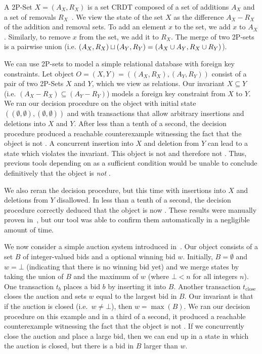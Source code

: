 A 2P-Set $X = (A_X, R_X)$ is a set CRDT composed of a set of additions $A_X$
and a set of removals $R_X$~\cite{shapiro2011comprehensive}. We view the state
of the set $X$ as the difference $A_X - R_X$ of the addition and removal sets.
To add an element $x$ to the set, we add $x$ to $A_X$. Similarly, to remove $x$
from the set, we add it to $R_X$. The merge of two 2P-sets is a pairwise union
(i.e. $(A_X, R_X) \sqcup (A_Y, R_Y) = (A_X \cup A_Y, R_X \cup R_Y)$).

We can use 2P-sets to model a simple relational database with foreign key
constraints. Let object $O = (X, Y) = ((A_X, R_X), (A_Y, R_Y))$ consist of a
pair of two 2P-Sets $X$ and $Y$, which we view as relations. Our invariant $X
\subseteq Y$ (i.e. $(A_X - R_X) \subseteq (A_Y - R_Y)$) models a foreign key
constraint from $X$ to $Y$. We ran our decision procedure on the object with
initial state $((\emptyset, \emptyset), (\emptyset, \emptyset))$ and with
transactions that allow arbitrary insertions and deletions into $X$ and $Y$.
After less than a tenth of a second, the decision procedure produced a
reachable counterexample witnessing the fact that the object is not
\invariantconfluent{}. A concurrent insertion into $X$ and deletion from $Y$
can lead to a state which violates the invariant. This object is not
\invariantconfluent{} and therefore not \invariantclosed{}. Thus, previous
tools depending on \invariantclosure{} as a sufficient condition would be
unable to conclude definitively that the object is \emph{not}
\invariantconfluent{}.

We also reran the decision procedure, but this time with insertions into $X$
and deletions from $Y$ disallowed. In less than a tenth of a second, the
decision procedure correctly deduced that the object is now
\invariantconfluent{}. These results were manually proven
in~\cite{bailis2014coordination}, but our tool was able to confirm them
automatically in a negligible amount of time.

\example[Auction]
We now consider a simple auction system introduced in~\cite{gotsman2016cause}.
Our object consists of a set $B$ of integer-valued bids and a optional winning
bid $w$. Initially, $B = \emptyset$ and $w = \bot$ (indicating that there is no
winning bid yet) and we merge states by taking the union of $B$ and the maximum
of $w$ (where $\bot < n$ for all integers $n$). One transaction $t_b$ places a
bid $b$ by inserting it into $B$. Another transaction $t_\text{close}$ closes
the auction and sets $w$ equal to the largest bid in $B$. Our invariant is that
if the auction is closed (i.e.\ $w \neq \bot$), then $w = \max(B)$. We ran our
decision procedure on this example and in a third of a second, it produced a
reachable counterexample witnessing the fact that the object is not
\invariantconfluent{}.  If we concurrently close the auction and place a large
bid, then we can end up in a state in which the auction is closed, but there is
a bid in $B$ larger than $w$.

